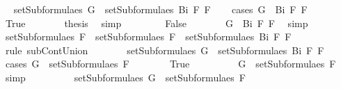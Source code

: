 \begin{isabellebody}
\ \isamarkupfalse%
\ {\isachardoublequoteopen}setSubformulae{\isacharunderscore}s\ G\ {\isasymsubseteq}\ setSubformulae{\isacharunderscore}s\ {\isacharparenleft}Bi\ F{}\ F{}{\isacharparenright}{\isachardoublequoteclose}\isanewline
\ \ \isamarkupfalse%
\ {\isacharparenleft}cases\ {\isachardoublequoteopen}G\ {\isacharequal}\ Bi\ F{}\ F{}{\isachardoublequoteclose}{\isacharparenright}\isanewline
\ \ \ \ \isamarkupfalse%
\ True\isanewline
\ \ \ \ \isamarkupfalse%
\ \isamarkupfalse%
\ {\isacharquery}thesis\ \isamarkupfalse%
\ simp\isanewline
\ \ \isamarkupfalse%
\isanewline
\ \ \ \ \isamarkupfalse%
\ False\isanewline
\ \ \ \ \isamarkupfalse%
\ \isamarkupfalse%
\ {}{\isacharcolon}{\isachardoublequoteopen}G\ {\isasymnoteq}\ Bi\ F{}\ F{}{\isachardoublequoteclose}\ \isamarkupfalse%
\ simp\isanewline
\ \ \ \ \isamarkupfalse%
\ {}{\isacharcolon}{\isachardoublequoteopen}setSubformulae{\isacharunderscore}s\ F{}\ {\isasymunion}\ setSubformulae{\isacharunderscore}s\ F{}\ {\isasymsubseteq}\ setSubformulae{\isacharunderscore}s\ {\isacharparenleft}Bi\ F{}\ F{}{\isacharparenright}{\isachardoublequoteclose}\ \isamarkupfalse%
\ {}\ \isamarkupfalse%
\ {\isacharparenleft}rule\ subContUnion{}{\isacharparenright}\isanewline
\ \ \ \ \isamarkupfalse%
\ \isamarkupfalse%
\ {\isachardoublequoteopen}setSubformulae{\isacharunderscore}s\ G\ {\isasymsubseteq}\ setSubformulae{\isacharunderscore}s\ {\isacharparenleft}Bi\ F{}\ F{}{\isacharparenright}{\isachardoublequoteclose}\isanewline
\ \ \ \ \isamarkupfalse%
\ {\isacharparenleft}cases\ {\isachardoublequoteopen}G\ {\isasymin}\ setSubformulae{\isacharunderscore}s\ F{}{\isachardoublequoteclose}{\isacharparenright}\isanewline
\ \ \ \ \ \ \isamarkupfalse%
\ True\isanewline
\ \ \ \ \ \ \isamarkupfalse%
\ \isamarkupfalse%
\ {\isachardoublequoteopen}G\ {\isasymin}\ setSubformulae{\isacharunderscore}s\ F{}{\isachardoublequoteclose}\ \isamarkupfalse%
\ simp\isanewline
\ \ \ \ \ \ \isamarkupfalse%
\ \isamarkupfalse%
\ {}{\isacharcolon}{\isachardoublequoteopen}setSubformulae{\isacharunderscore}s\ G\ {\isasymsubseteq}\ setSubformulae{\isacharunderscore}s\ F{}{\isachardoublequoteclose}\ \isamarkupfalse%

\end{isabellebody}
